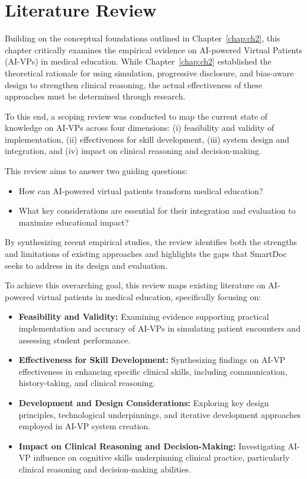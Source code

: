 \chapter{Literature Review} \label{chap:ch3}

Building on the conceptual foundations outlined in Chapter~\ref{chap:ch2},
this chapter critically examines the empirical evidence on AI-powered Virtual
Patients (AI-VPs) in medical education. While Chapter~\ref{chap:ch2} established
the theoretical rationale for using simulation, progressive disclosure, and
bias-aware design to strengthen clinical reasoning, the actual effectiveness
of these approaches must be determined through research.

To this end, a scoping review was conducted to map the current state of knowledge
on AI-VPs across four dimensions:
(i) feasibility and validity of implementation,
(ii) effectiveness for skill development,
(iii) system design and integration, and
(iv) impact on clinical reasoning and decision-making.

This review aims to answer two guiding questions:
\begin{itemize}
\item How can AI-powered virtual patients transform medical education?
\item What key considerations are essential for their integration and evaluation
to maximize educational impact?
\end{itemize}

By synthesizing recent empirical studies, the review identifies both the strengths
and limitations of existing approaches and highlights the gaps that SmartDoc seeks
to address in its design and evaluation.


To achieve this overarching goal, this review maps existing literature on AI-powered virtual patients in medical education, specifically focusing on:

\begin{itemize}
\item \textbf{Feasibility and Validity:} Examining evidence supporting practical implementation and accuracy of AI-VPs in simulating patient encounters and assessing student performance.
\item \textbf{Effectiveness for Skill Development:} Synthesizing findings on AI-VP effectiveness in enhancing specific clinical skills, including communication, history-taking, and clinical reasoning.
\item \textbf{Development and Design Considerations:} Exploring key design principles, technological underpinnings, and iterative development approaches employed in AI-VP system creation.
\item \textbf{Impact on Clinical Reasoning and Decision-Making:} Investigating AI-VP influence on cognitive skills underpinning clinical practice, particularly clinical reasoning and decision-making abilities.
\end{itemize}

